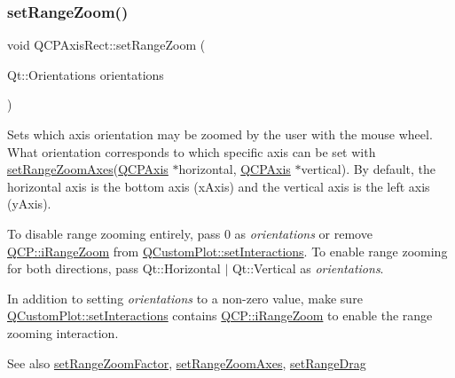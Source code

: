 \subsubsection{\texorpdfstring{set\+Range\+Zoom()}{setRangeZoom()}}
{\footnotesize\ttfamily void Q\+C\+P\+Axis\+Rect\+::set\+Range\+Zoom (\begin{DoxyParamCaption}\item[{Qt\+::\+Orientations}]{orientations }\end{DoxyParamCaption})}

Sets which axis orientation may be zoomed by the user with the mouse wheel. What orientation corresponds to which specific axis can be set with \mbox{\hyperlink{class_q_c_p_axis_rect_a9442cca2aa358405f39a64d51eca13d2}{set\+Range\+Zoom\+Axes}}(\mbox{\hyperlink{class_q_c_p_axis}{Q\+C\+P\+Axis}} $\ast$horizontal, \mbox{\hyperlink{class_q_c_p_axis}{Q\+C\+P\+Axis}} $\ast$vertical). By default, the horizontal axis is the bottom axis (x\+Axis) and the vertical axis is the left axis (y\+Axis).

To disable range zooming entirely, pass 0 as {\itshape orientations} or remove \mbox{\hyperlink{namespace_q_c_p_a2ad6bb6281c7c2d593d4277b44c2b037abee1e94353525a636aeaf0ba32b72e14}{Q\+C\+P\+::i\+Range\+Zoom}} from \mbox{\hyperlink{class_q_custom_plot_a5ee1e2f6ae27419deca53e75907c27e5}{Q\+Custom\+Plot\+::set\+Interactions}}. To enable range zooming for both directions, pass {\ttfamily Qt\+::\+Horizontal $\vert$ Qt\+::\+Vertical} as {\itshape orientations}.

In addition to setting {\itshape orientations} to a non-\/zero value, make sure \mbox{\hyperlink{class_q_custom_plot_a5ee1e2f6ae27419deca53e75907c27e5}{Q\+Custom\+Plot\+::set\+Interactions}} contains \mbox{\hyperlink{namespace_q_c_p_a2ad6bb6281c7c2d593d4277b44c2b037abee1e94353525a636aeaf0ba32b72e14}{Q\+C\+P\+::i\+Range\+Zoom}} to enable the range zooming interaction.

\begin{DoxySeeAlso}{See also}
\mbox{\hyperlink{class_q_c_p_axis_rect_a895d7ac745ea614e04056244b3c138ac}{set\+Range\+Zoom\+Factor}}, \mbox{\hyperlink{class_q_c_p_axis_rect_a9442cca2aa358405f39a64d51eca13d2}{set\+Range\+Zoom\+Axes}}, \mbox{\hyperlink{class_q_c_p_axis_rect_ae6aef2f7211ba6097c925dcd26008418}{set\+Range\+Drag}} 
\end{DoxySeeAlso}
\mbox{\label{class_q_c_p_axis_rect_a9442cca2aa358405f39a64d51eca13d2}} 
